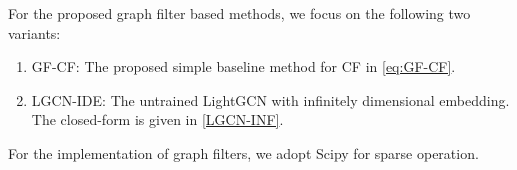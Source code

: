 \documentclass[sigconf]{acmart}
\begin{document}
For the proposed graph filter based methods, we focus on the following two variants: 
\begin{enumerate}
\item GF-CF: The proposed simple baseline method for CF in \eqref{eq:GF-CF}.
    \item LGCN-IDE: The untrained LightGCN with infinitely dimensional embedding. The closed-form is given in \eqref{LGCN-INF}. 
\end{enumerate}
For the implementation of graph filters, we adopt Scipy \cite{virtanen2020scipy} for sparse operation. 


\begin{table}[t!] 
\caption{The comparison of overall performance among GF-CF and competing methods. The performance of benchmarks is reproduced from \cite{he2020lightgcn}.}
\label{tab:overall}
\end{table}
\end{document}
